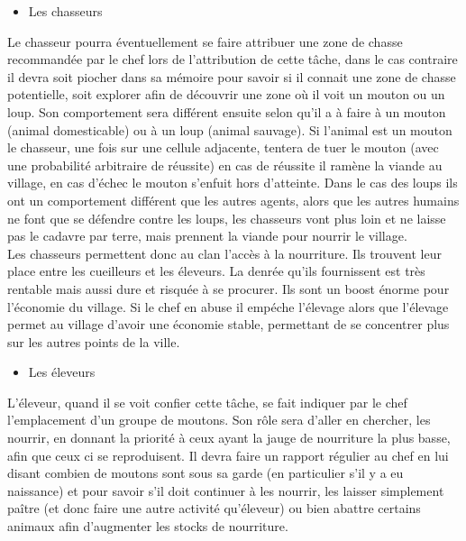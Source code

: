 \documentclass[12pt]{article}
\begin{document}
		\begin{itemize}
		\item Les chasseurs\\
		\end{itemize}

Le chasseur pourra éventuellement se faire attribuer une zone de chasse 
recommandée par le chef lors de l'attribution de cette tâche, dans le cas 
contraire il devra soit piocher dans sa mémoire pour savoir si il connait 
une zone de chasse potentielle, soit explorer afin de découvrir une zone 
où il voit un mouton ou un loup. Son comportement sera différent ensuite selon 
qu'il a à faire à un mouton (animal domesticable) ou à un loup (animal sauvage).
Si l'animal est un mouton le chasseur, une fois sur une cellule adjacente,
tentera de tuer le mouton (avec une probabilité arbitraire de réussite) en 
cas de réussite il ramène la viande au village, en cas d'échec le mouton 
s'enfuit hors d'atteinte. Dans le cas des loups ils ont un comportement 
différent que les autres agents, alors que les autres humains ne font que se 
défendre contre les loups, les chasseurs vont plus loin et ne laisse pas le 
cadavre par terre, mais prennent la viande pour nourrir le village.\\

Les chasseurs permettent donc au clan l'accès à la nourriture. Ils trouvent leur
place entre les cueilleurs et les éleveurs. La denrée qu'ils fournissent est 
très rentable mais aussi dure et risquée à se procurer. Ils sont un boost 
énorme pour l'économie du village. Si le chef en abuse il empéche l'élevage 
alors que l'élevage permet au village d'avoir une économie stable, permettant 
de se concentrer plus sur les autres points de la ville.\\

		\begin{itemize}
		\item Les éleveurs\\
		\end{itemize}

L'éleveur, quand il se voit confier cette tâche, se fait indiquer par le chef 
l'emplacement d'un groupe de moutons. Son rôle sera d'aller en chercher, les 
nourrir, en donnant la priorité à ceux ayant la jauge de nourriture la plus 
basse, afin que ceux ci se reproduisent. Il devra faire un rapport régulier au 
chef en lui disant combien de moutons sont sous sa garde (en particulier s'il 
y a eu naissance) et pour savoir s'il doit continuer à les nourrir, les laisser 
simplement paître (et donc faire une autre activité qu'éleveur) ou bien abattre 
certains animaux afin d'augmenter les stocks de nourriture.\\
\end{document}
